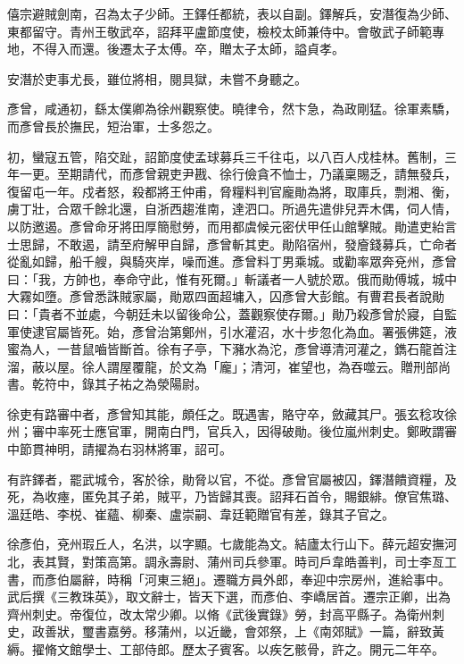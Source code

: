 \begin{pinyinscope}
 僖宗避賊劍南，召為太子少師。王鐸任都統，表以自副。鐸解兵，安潛復為少師、東都留守。青州王敬武卒，詔拜平盧節度使，檢校太師兼侍中。會敬武子師範專地，不得入而還。後遷太子太傅。卒，贈太子太師，謚貞孝。



 安潛於吏事尤長，雖位將相，閱具獄，未嘗不身聽之。



 彥曾，咸通初，繇太僕卿為徐州觀察使。曉律令，然卞急，為政剛猛。徐軍素驕，而彥曾長於撫民，短治軍，士多怨之。



 初，蠻寇五管，陷交趾，詔節度使孟球募兵三千往屯，以八百人戍桂林。舊制，三年一更。至期請代，而彥曾親吏尹戡、徐行儉貪不恤士，乃議稟賜乏，請無發兵，復留屯一年。戍者怒，殺都將王仲甫，脅糧料判官龐勛為將，取庫兵，剽湘、衡，虜丁壯，合眾千餘北還，自浙西趨淮南，達泗口。所過先遣俳兒弄木偶，伺人情，以防邀遏。彥曾命牙將田厚簡慰勞，而用都虞候元密伏甲任山館擊賊。勛遣吏紿言士思歸，不敢遏，請至府解甲自歸，彥曾斬其吏。勛陷宿州，發廥錢募兵，亡命者從亂如歸，船千艘，與騎夾岸，噪而進。彥曾料丁男乘城。或勸率眾奔兗州，彥曾曰：「我，方帥也，奉命守此，惟有死爾。」斬議者一人號於眾。俄而勛傅城，城中大霧如墮。彥曾悉誅賊家屬，勛眾四面超墉入，囚彥曾大彭館。有曹君長者說勛曰：「貴者不並處，今朝廷未以留後命公，蓋觀察使存爾。」勛乃殺彥曾於寢，自監軍使逮官屬皆死。始，彥曾治第鄭州，引水灌沼，水十步忽化為血。署張佛筵，液蜜為人，一昔鼠嚙皆斷首。徐有子亭，下瀦水為沱，彥曾導清河灌之，鐫石龍首注溜，蔽以屋。徐人謂屋覆龍，於文為「龐」；清河，崔望也，為吞噬云。贈刑部尚書。乾符中，錄其子祐之為滎陽尉。



 徐吏有路審中者，彥曾知其能，頗任之。既遇害，賂守卒，斂藏其尸。張玄稔攻徐州；審中率死士應官軍，開南白門，官兵入，因得破勛。後位嵐州刺史。鄭畋謂審中節貫神明，請擢為右羽林將軍，詔可。



 有許鐸者，罷武城令，客於徐，勛脅以官，不從。彥曾官屬被囚，鐸潛饋資糧，及死，為收瘞，匿免其子弟，賊平，乃皆歸其喪。詔拜石首令，賜銀緋。僚官焦璐、溫廷皓、李棁、崔蘊、柳秦、盧崇嗣、韋廷範贈官有差，錄其子官之。



 徐彥伯，兗州瑕丘人，名洪，以字顯。七歲能為文。結廬太行山下。薛元超安撫河北，表其賢，對策高第。調永壽尉、蒲州司兵參軍。時司戶韋皓善判，司士李亙工書，而彥伯屬辭，時稱「河東三絕」。遷職方員外郎，奉迎中宗房州，進給事中。武后撰《三教珠英》，取文辭士，皆天下選，而彥伯、李嶠居首。遷宗正卿，出為齊州刺史。帝復位，改太常少卿。以脩《武後實錄》勞，封高平縣子。為衛州刺史，政善狀，璽書嘉勞。移蒲州，以近畿，會郊祭，上《南郊賦》一篇，辭致黃縟。擢脩文館學士、工部侍郎。歷太子賓客。以疾乞骸骨，許之。開元二年卒。




\end{pinyinscope}
